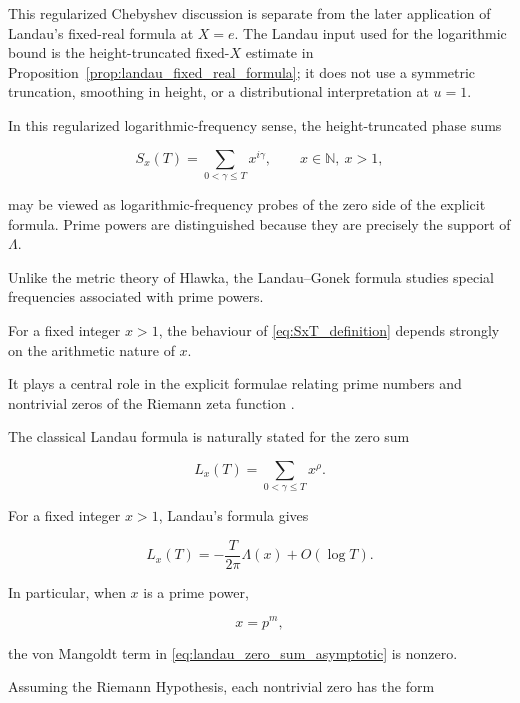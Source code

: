 \documentclass[11pt]{amsart}
\numberwithin{equation}{section}
\theoremstyle{plain}
\theoremstyle{definition}
\theoremstyle{remark}
\begin{document}
This regularized Chebyshev discussion is separate from the later
application of Landau's fixed-real formula at \(X=e\). The Landau input
used for the logarithmic bound is the height-truncated fixed-\(X\)
estimate in Proposition~\ref{prop:landau_fixed_real_formula}; it does
not use a symmetric truncation, smoothing in height, or a distributional
interpretation at \(u=1\).

In this regularized logarithmic-frequency sense, the height-truncated
phase sums

\begin{equation}
S_x(T)
=
\sum_{0<\gamma\leq T}x^{i\gamma},
\qquad x\in\mathbb N,\ x>1,
\label{eq:SxT_definition}
\end{equation}

may be viewed as logarithmic-frequency probes of the zero side of the
explicit formula. Prime powers are distinguished because they are
precisely the support of \(\Lambda\).

Unlike the metric theory of Hlawka,
the Landau--Gonek formula studies special frequencies associated with
prime powers.

For a fixed integer \(x>1\), the behaviour of \eqref{eq:SxT_definition}
depends strongly on the arithmetic nature of \(x\).

It plays a central role in the explicit formulae relating prime numbers
and nontrivial zeros of the Riemann zeta function
\cite{Landau1911,Titchmarsh1986,IwaniecKowalski2004}.

The classical Landau formula is naturally stated for the zero sum

\begin{equation}
L_x(T)
=
\sum_{0<\gamma\le T}
x^\rho.
\label{eq:landau_zero_sum}
\end{equation}

For a fixed integer \(x>1\), Landau's formula gives

\begin{equation}
L_x(T)
=
-
\frac{T}{2\pi}
\Lambda(x)
+
O(\log T).
\label{eq:landau_zero_sum_asymptotic}
\end{equation}

In particular, when \(x\) is a prime power,

\begin{equation}
x=p^m,
\label{eq:prime_power_condition}
\end{equation}

the von Mangoldt term in \eqref{eq:landau_zero_sum_asymptotic} is
nonzero.

Assuming the Riemann Hypothesis, each nontrivial zero has the form
\end{document}
